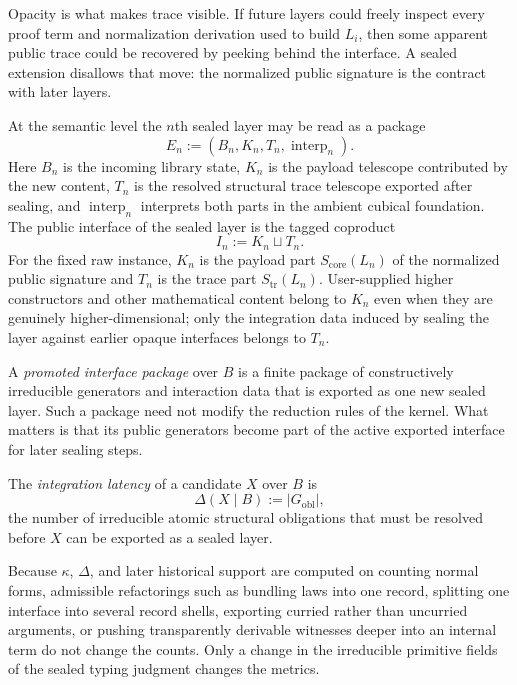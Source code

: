 Opacity is what makes trace visible.  If future layers could freely inspect every proof term and
normalization derivation used to build \(L_i\), then some apparent public trace could be
recovered by peeking behind the interface.  A sealed extension disallows that move: the
normalized public signature is the contract with later layers.

\begin{definition}
At the semantic level the \(n\)th sealed layer may be read as a package
\[
  E_n := (B_n,K_n,T_n,\operatorname{interp}_n).
\]
Here \(B_n\) is the incoming library state, \(K_n\) is the payload telescope contributed by
the new content, \(T_n\) is the resolved structural trace telescope exported after sealing, and
\(\operatorname{interp}_n\) interprets both parts in the ambient cubical foundation.  The public
interface of the sealed layer is the tagged coproduct
\[
  I_n := K_n \sqcup T_n.
\]
For the fixed raw instance, \(K_n\) is the payload part \(S_{\mathrm{core}}(L_n)\) of the
normalized public signature and \(T_n\) is the trace part \(S_{\mathrm{tr}}(L_n)\).  User-supplied
higher constructors and other mathematical content belong to \(K_n\) even when they are
genuinely higher-dimensional; only the integration data induced by sealing the layer against
earlier opaque interfaces belongs to \(T_n\).
\end{definition}

\begin{definition}
A \emph{promoted interface package} over \(B\) is a finite package of constructively
irreducible generators and interaction data that is exported as one new sealed layer.  Such a
package need not modify the reduction rules of the kernel.  What matters is that its public
generators become part of the active exported interface for later sealing steps.
\end{definition}

\begin{definition}
The \emph{integration latency} of a candidate \(X\) over \(B\) is
\[
  \Delta(X\mid B) := |G_{\mathrm{obl}}|,
\]
the number of irreducible atomic structural obligations that must be resolved before \(X\)
can be exported as a sealed layer.
\end{definition}

\begin{remark}
Because \(\kappa\), \(\Delta\), and later historical support are computed on counting normal
forms, admissible refactorings such as bundling laws into one record, splitting one interface
into several record shells, exporting curried rather than uncurried arguments, or pushing
transparently derivable witnesses deeper into an internal term do not change the counts.
Only a change in the irreducible primitive fields of the sealed typing judgment changes the
metrics.
\end{remark}


